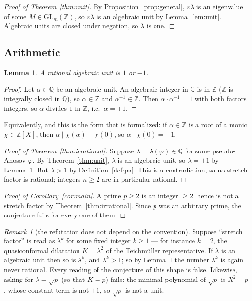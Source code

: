 \documentclass[11pt]{article}
\theoremstyle{plain}
\newtheorem{lemma}[theorem]{Lemma}
\theoremstyle{definition}
\theoremstyle{remark}
\newtheorem{remark}[theorem]{Remark}
\newcommand{\ZZ}{\mathbb{Z}}
\newcommand{\QQ}{\mathbb{Q}}
\begin{document}
\begin{proof}[Proof of Theorem~\ref{thm:unit}]
By Proposition~\ref{prop:general}, $\varepsilon\lambda$ is an eigenvalue of some
$M\in\mathrm{GL}_{m}(\ZZ)$, so $\varepsilon\lambda$ is an algebraic unit by
Lemma~\ref{lem:unit}. Algebraic units are closed under negation, so $\lambda$ is
one.
\end{proof}

\subsection{Arithmetic}

\begin{lemma}\label{lem:rational}
A rational algebraic unit is $1$ or $-1$.
\end{lemma}

\begin{proof}
Let $\alpha\in\QQ$ be an algebraic unit. An algebraic integer in $\QQ$ is in $\ZZ$
($\ZZ$ is integrally closed in $\QQ$), so $\alpha\in\ZZ$ and $\alpha^{-1}\in\ZZ$.
Then $\alpha\cdot\alpha^{-1}=1$ with both factors integers, so $\alpha$ divides
$1$ in $\ZZ$, i.e.\ $\alpha=\pm1$.
\end{proof}

Equivalently, and this is the form that is formalized: if $\alpha\in\ZZ$ is a root
of a monic $\chi\in\ZZ[X]$, then $\alpha\mid\chi(\alpha)-\chi(0)$, so
$\alpha\mid\chi(0)=\pm1$.

\begin{proof}[Proof of Theorem~\ref{thm:irrational}]
Suppose $\lambda=\lambda(\varphi)\in\QQ$ for some pseudo-Anosov $\varphi$. By
Theorem~\ref{thm:unit}, $\lambda$ is an algebraic unit, so $\lambda=\pm1$ by
Lemma~\ref{lem:rational}. But $\lambda>1$ by Definition~\ref{def:pa}. This is a
contradiction, so no stretch factor is rational; integers $n\ge2$ are in
particular rational.
\end{proof}

\begin{proof}[Proof of Corollary~\ref{cor:main}]
A prime $p\ge2$ is an integer $\ge2$, hence is not a stretch factor by
Theorem~\ref{thm:irrational}. Since $p$ was an arbitrary prime, the conjecture
fails for every one of them.
\end{proof}

\begin{remark}[the refutation does not depend on the convention]
\label{rem:convention}
Suppose ``stretch factor'' is read as $\lambda^{k}$ for some fixed integer $k\ge1$
--- for instance $k=2$, the quasiconformal dilatation $K=\lambda^{2}$ of the
Teichmüller representative. If $\lambda$ is an algebraic unit then so is
$\lambda^{k}$, and $\lambda^{k}>1$; so by Lemma~\ref{lem:rational} the number
$\lambda^{k}$ is again never rational. Every reading of the conjecture of this
shape is false. Likewise, asking for $\lambda=\sqrt p$ (so that $K=p$) fails: the
minimal polynomial of $\sqrt p$ is $X^{2}-p$, whose constant term is not $\pm1$, so
$\sqrt{p}$ is not a unit.
\end{remark}
\end{document}
